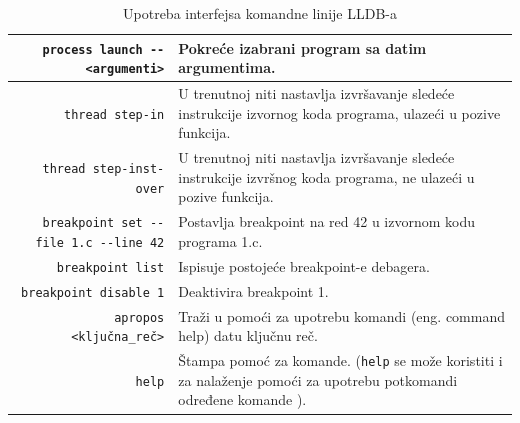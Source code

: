 \documentclass[a4paper]{article}
\begin{document}
\begin{table}[h!]
	\begin{center}
		\caption{Upotreba interfejsa komandne linije LLDB-a \cite{lldb_to_gdb_map}\cite{lldb_tutorial}}
		\small
		\begin{tabular}{|r|p{5cm}|}
			\hline
			\verb|process launch -- <argumenti>|
			& Pokreće izabrani program sa datim argumentima. \\ \hline
			\verb|thread step-in|
			& U trenutnoj niti nastavlja izvršavanje sledeće instrukcije izvornog koda programa, ulazeći u pozive funkcija.  \\ \hline
			\verb|thread step-inst-over|
			& U trenutnoj niti nastavlja izvršavanje sledeće instrukcije izvršnog koda programa, ne ulazeći u pozive funkcija. \\ \hline
			\verb|breakpoint set --file 1.c --line 42|
			& Postavlja breakpoint na red 42 u izvornom kodu programa 1.c. \\ \hline
			\verb|breakpoint list|
			& Ispisuje postojeće breakpoint-e debagera. \\ \hline
			\verb|breakpoint disable 1|
			& Deaktivira breakpoint 1. \\ \hline
			\verb|apropos <ključna_reč>|
			& Traži u pomoći za upotrebu komandi (eng. command help) datu ključnu reč. \\ \hline
			\verb|help|
			& Štampa pomoć za komande. (\verb|help| se može koristiti i za nalaženje pomoći za upotrebu potkomandi određene komande \cite{apple_lldb_comms}). \\ \hline
		\end{tabular}
		\label{tab:tabela3}
	\end{center}
\end{table}

\end{document}
